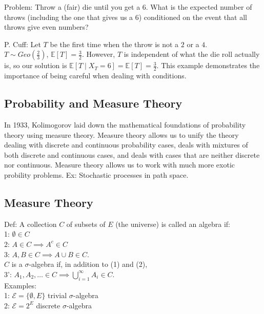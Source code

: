 \documentclass[english, 11pt]{article}
\begin{document}
Problem: Throw a (fair) die until you get a 6. What is the expected number of throws (including the one that gives us a 6) conditioned on the event that all throws give even numbers?

P. Cuff: Let $T$ be the first time when the throw is not a $2$ or a $4$.\\

$T \sim Geo(\frac{2}{3})$, $\mathbb{E}[T] = \frac{3}{2}$. However, $T$ is independent of what the die roll actually is, so our solution is $\mathbb{E}[T \mid X_T = 6] = \mathbb{E}[T] = \frac{3}{2}$. This example demonstrates the importance of being careful when dealing with conditions.\\

\subsection{Probability and Measure Theory}

In 1933, Kolimogorov laid down the mathematical foundations of probability theory using measure theory. Measure theory allows us to unify the theory dealing with discrete and continuous probability cases, deals with mixtures of both discrete and continuous cases, and deals with cases that are neither discrete nor continuous. Measure theory allows us to work with much more exotic probility problems. Ex: Stochastic processes in path space.\\

\subsection{Measure Theory}

Def: A collection $C$ of subsets of $E$ (the universe) is called an algebra if:\\
1: $\emptyset \in C$\\
2: $A \in C \implies A^c \in C$\\
3: $A, B \in C \implies A \cup B \in C$.\\

$C$ is a $\sigma$-algebra if, in addition to (1) and (2),\\
3': $A_1, A_2, \dots \in C \implies \bigcup^\infty_{i = 1}A_i \in C$.\\

Examples:\\
1: $\mathcal{E} = \{\emptyset, E\}$ trivial $\sigma$-algebra\\
2: $\mathcal{E} = 2^E$ discrete $\sigma$-algebra
\end{document}
